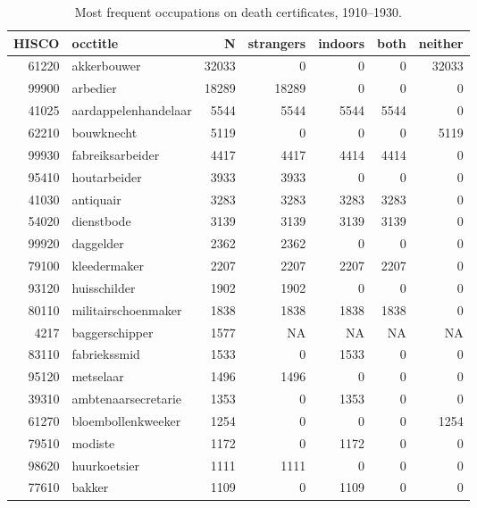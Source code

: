 \begin{table}

\caption{\label{tab:tab:topoccs_overal}Most frequent occupations on death certificates, 1910–1930.}
\centering
\begin{tabular}[t]{r|l|r|r|r|r|r}
\hline
HISCO & occtitle & N & strangers & indoors & both & neither\\
\hline
61220 & akkerbouwer & 32033 & 0 & 0 & 0 & 32033\\
\hline
99900 & arbedier & 18289 & 18289 & 0 & 0 & 0\\
\hline
41025 & aardappelenhandelaar & 5544 & 5544 & 5544 & 5544 & 0\\
\hline
62210 & bouwknecht & 5119 & 0 & 0 & 0 & 5119\\
\hline
99930 & fabreiksarbeider & 4417 & 4417 & 4414 & 4414 & 0\\
\hline
95410 & houtarbeider & 3933 & 3933 & 0 & 0 & 0\\
\hline
41030 & antiquair & 3283 & 3283 & 3283 & 3283 & 0\\
\hline
54020 & dienstbode & 3139 & 3139 & 3139 & 3139 & 0\\
\hline
99920 & daggelder & 2362 & 2362 & 0 & 0 & 0\\
\hline
79100 & kleedermaker & 2207 & 2207 & 2207 & 2207 & 0\\
\hline
93120 & huisschilder & 1902 & 1902 & 0 & 0 & 0\\
\hline
80110 & militairschoenmaker & 1838 & 1838 & 1838 & 1838 & 0\\
\hline
4217 & baggerschipper & 1577 & NA & NA & NA & NA\\
\hline
83110 & fabriekssmid & 1533 & 0 & 1533 & 0 & 0\\
\hline
95120 & metselaar & 1496 & 1496 & 0 & 0 & 0\\
\hline
39310 & ambtenaarsecretarie & 1353 & 0 & 1353 & 0 & 0\\
\hline
61270 & bloembollenkweeker & 1254 & 0 & 0 & 0 & 1254\\
\hline
79510 & modiste & 1172 & 0 & 1172 & 0 & 0\\
\hline
98620 & huurkoetsier & 1111 & 1111 & 0 & 0 & 0\\
\hline
77610 & bakker & 1109 & 0 & 1109 & 0 & 0\\
\hline
\end{tabular}
\end{table}
